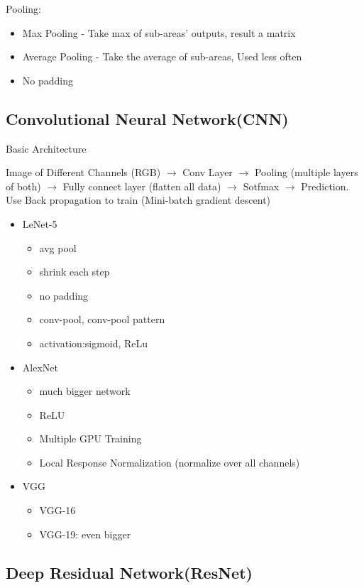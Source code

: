 \documentclass[11pt, openany]{book}              %
\begin{document}
Pooling:
\begin{itemize}
	\item Max Pooling - Take max of sub-areas' outputs, result a matrix
	\item Average Pooling - Take the average of sub-areas, Used less often
	\item No padding
\end{itemize}



\subsection{Convolutional Neural Network(CNN)}

Basic Architecture

Image of Different Channels (RGB)  $\rightarrow$  Conv Layer  $\rightarrow$  Pooling (multiple layers of both)  $\rightarrow$  Fully connect layer (flatten all data)  $\rightarrow$  Sotfmax  $\rightarrow$ Prediction. Use Back propagation to train (Mini-batch gradient descent)

\begin{itemize}
\item LeNet-5
\begin{itemize}
	\item avg pool
	\item shrink each step
	\item no padding
	\item conv-pool, conv-pool pattern
	\item activation:sigmoid, ReLu
\end{itemize}
\item AlexNet
\begin{itemize}
	\item much bigger network
	\item ReLU
	\item Multiple GPU Training
	\item Local Response Normalization (normalize over all channels)
\end{itemize}
\item VGG
\begin{itemize}
	\item VGG-16
	\item VGG-19: even bigger
\end{itemize}
\end{itemize}


\subsection{Deep Residual Network(ResNet)}
\end{document}

